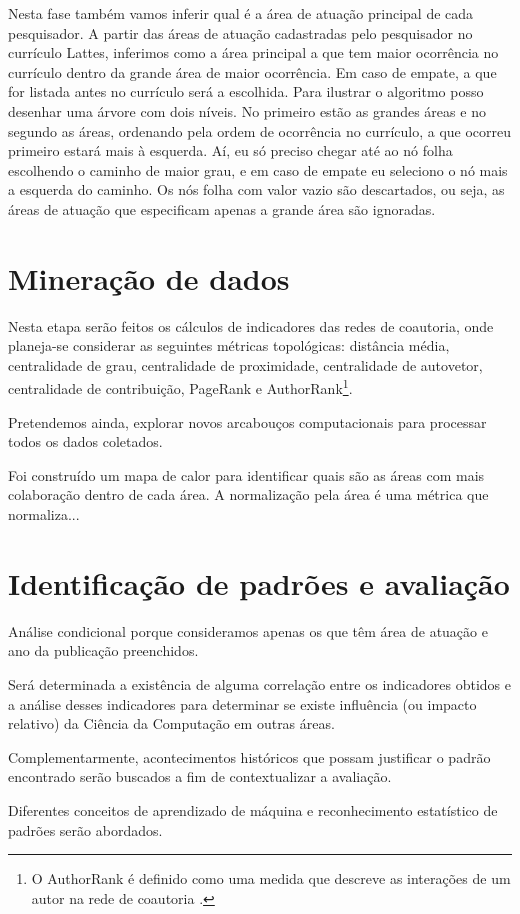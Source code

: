 Nesta fase também vamos inferir qual é a área de atuação principal de cada pesquisador. A partir das áreas de atuação cadastradas pelo pesquisador no currículo Lattes, inferimos como a área principal a que tem maior ocorrência no currículo dentro da grande área de maior ocorrência. Em caso de empate, a que for listada antes no currículo será a escolhida. Para ilustrar o algoritmo posso desenhar uma árvore com dois níveis. No primeiro estão as grandes áreas e no segundo as áreas, ordenando pela ordem de ocorrência no currículo, a que ocorreu primeiro estará mais à esquerda. Aí, eu só preciso chegar até ao nó folha escolhendo o caminho de maior grau, e em caso de empate eu seleciono o nó mais a esquerda do caminho. Os nós folha com valor vazio são descartados, ou seja, as áreas de atuação que especificam apenas a grande área são ignoradas.

\section{Mineração de dados}

Nesta etapa serão feitos os cálculos de indicadores das redes de coautoria, onde planeja-se considerar as seguintes métricas topológicas: distância média, centralidade de grau, centralidade de proximidade, centralidade de autovetor, centralidade de contribuição, PageRank e AuthorRank\footnote{O AuthorRank é definido como uma medida que descreve as interações de um autor na rede de coautoria \cite{liu2005co}.}.

Pretendemos ainda, explorar novos arcabouços computacionais para processar todos os dados coletados.

Foi construído um mapa de calor para identificar quais são as áreas com mais colaboração dentro de cada área. A normalização pela área é uma métrica que normaliza...

\section{Identificação de padrões e avaliação}

Análise condicional porque consideramos apenas os que têm área de atuação e ano da publicação preenchidos.

Será determinada a existência de alguma correlação entre os indicadores obtidos e a análise desses indicadores para determinar se existe influência (ou impacto relativo) da Ciência da Computação em outras áreas.

Complementarmente, acontecimentos históricos que possam justificar o padrão encontrado serão buscados a fim de contextualizar a avaliação.

Diferentes conceitos de aprendizado de máquina e reconhecimento estatístico de padrões serão abordados.

